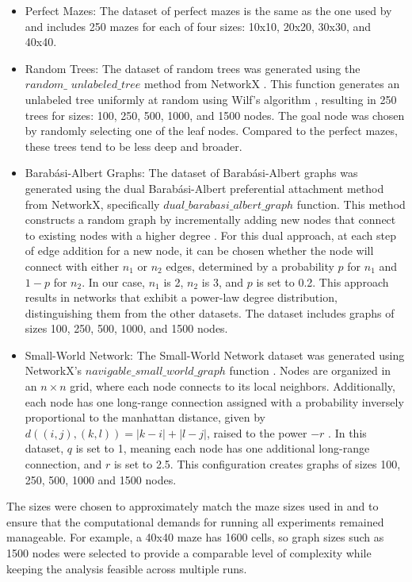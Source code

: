 \begin{itemize} 
    \item Perfect Mazes: The dataset of perfect mazes \cite{Naeem2021} is the same as the one used by  and includes 250 mazes for each of four sizes: 10x10, 20x20, 30x30, and 40x40.
    \item Random Trees: The dataset of random trees was generated using the $random\_$ $unlabeled\_tree$ method from NetworkX \cite{Hagberg2008}. This function generates an unlabeled tree uniformly at random using Wilf's algorithm \cite{Wilf1981}, resulting in 250 trees for sizes: 100, 250, 500, 1000, and 1500 nodes. The goal node was chosen by randomly selecting one of the leaf nodes. Compared to the perfect mazes, these trees tend to be less deep and broader.
    \item Barabási-Albert Graphs: The dataset of Barabási-Albert graphs was generated using the dual Barabási-Albert preferential attachment method \cite{Moshiri2018} from NetworkX, specifically $dual\_barabasi\_albert\_graph$ function. This method constructs a random graph by incrementally adding new nodes that connect to existing nodes with a higher degree \cite{Barabasi1999}. For this dual approach, at each step of edge addition for a new node, it can be chosen whether the node will connect with either $n_1$ or $n_2$ edges, determined by a probability $p$ for $n_1$ and $1-p$ for $n_2$. In our case, $n_1$ is 2, $n_2$ is 3, and $p$ is set to 0.2. This approach results in networks that exhibit a power-law degree distribution, distinguishing them from the other datasets. The dataset includes graphs of sizes 100, 250, 500, 1000, and 1500 nodes.
    \item Small-World Network: The Small-World Network dataset was generated using NetworkX's $navigable\_small\_world\_graph$ function \cite{Hagberg2008}. Nodes are organized in an $n \times n$ grid, where each node connects to its local neighbors. Additionally, each node has one long-range connection assigned with a probability inversely proportional to the manhattan distance, given by $d((i,j),(k,l)) = |k-i| + |l-j|$, raised to the power $-r$ \cite{Kleinberg2000}. In this dataset, $q$ is set to 1, meaning each node has one additional long-range connection, and $r$ is set to 2.5. This configuration creates graphs of sizes 100, 250, 500, 1000 and 1500 nodes.
\end{itemize}

The sizes were chosen to approximately match the maze sizes used in  and to ensure that the computational demands for running all experiments remained manageable. For example, a 40x40 maze has 1600 cells, so graph sizes such as 1500 nodes were selected to provide a comparable level of complexity while keeping the analysis feasible across multiple runs.

